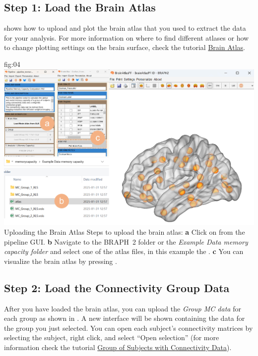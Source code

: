 \documentclass[justified]{tufte-handout}
\begin{document}
\clearpage
\subsection{Step 1: Load the Brain Atlas}


 shows how to upload and plot the brain atlas that you used to extract the data for your analysis. For more information on where to find different atlases or how to change plotting settings on the brain surface, check the tutorial \href{https://github.com/braph-software/BRAPH-2/tree/develop/tutorials/data/tut_ba}{Brain Atlas}.

{fig:04}
{
	\includegraphics{fig04.jpg}
}
{Uploading the Brain Atlas}
{
	Steps to upload the brain atlas:
	{\bf a} Click on  from the pipeline GUI.
	{\bf b} Navigate to the BRAPH~2 folder  or the \emph{Example Data memory capacity folder} and select one of the atlas files, in this example the . 
	{\bf c} You can visualize the brain atlas by pressing . 
}

\clearpage
\subsection{Step 2: Load the Connectivity Group Data}

After you have loaded the brain atlas, you can upload the \emph{Group MC data} for each group as shown in . A new interface will be shown containing the data for the group you just selected. You can open each subject’s connectivity matrices by selecting the subject, right click, and select “Open selection” (for more information check the tutorial \href{https://github.com/braph-software/BRAPH-2/tree/develop/tutorials/data/tut_gr_con}{Group of Subjects with Connectivity Data}).
\end{document}

